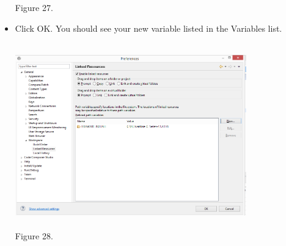 \documentclass[a4paper,10pt,oneside]{article}
\begin{document}
\begin{itemize}
\begin{center}
						Figure 27.
						\end{center}
						\item Click OK. You should see your new variable listed in the Variables list.\\
						\begin{center}
						\includegraphics[width=10cm, height=8cm]{Images/AddVariables6}\\
						Figure 28.	
					\end{center}
					\end{itemize}
\end{document}
